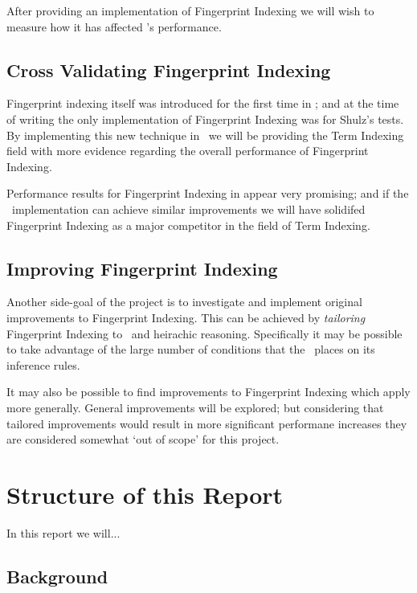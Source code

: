 After providing an implementation of Fingerprint Indexing we will wish to measure
how it has affected \beagle's performance.

\subsection{Cross Validating Fingerprint Indexing}

Fingerprint indexing itself was introduced for the first
time in \cite{shulz12}; and at the time of writing the only
implementation of Fingerprint Indexing was for Shulz's tests. By implementing this new technique in \beagle\ 
we will be providing the Term Indexing field with more evidence regarding the
overall performance of Fingerprint Indexing.

Performance results for Fingerprint Indexing in \cite{shulz12} appear very promising;
and if the \beagle\ implementation can achieve similar improvements we will
have solidifed Fingerprint Indexing as a major competitor in the field of Term Indexing.

\subsection{Improving Fingerprint Indexing}

Another side-goal of the project is to investigate and implement original
improvements to Fingerprint Indexing.
This can be achieved by \emph{tailoring} Fingerprint Indexing to \beagle\ 
and heirachic reasoning. Specifically it may be possible to take
advantage of the large number of conditions that the \HSWAC\ places on
its inference rules.

It may also be possible to find improvements to Fingerprint Indexing which
apply more generally. General improvements will be explored; but considering
that tailored improvements would result in more significant performane increases they
are considered somewhat `out of scope' for this project.

\section{Structure of this Report}
\label{sec:framework}

In this report we will...

\subsection{Background}

